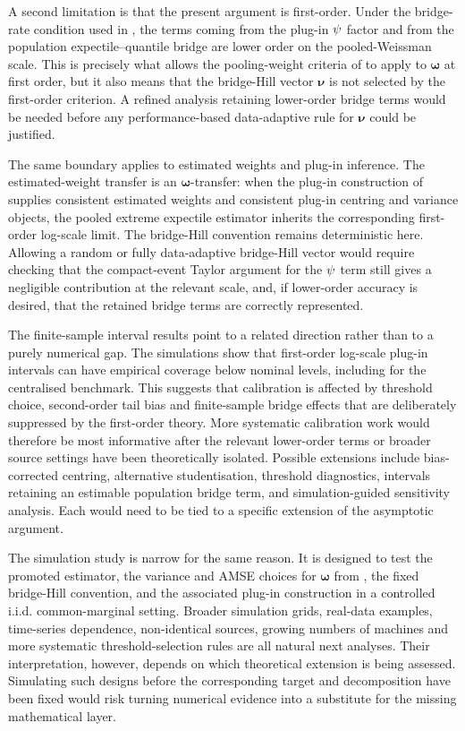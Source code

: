 A second limitation is that the present argument is first-order. Under the
bridge-rate condition used in , the terms coming from
the plug-in \(\psi\) factor and from the population expectile--quantile
bridge are lower order on the pooled-Weissman scale. This is precisely what
allows the pooling-weight criteria of
\textcite[Corollary~5]{DaouiaPadoanStupfler2021} to apply to \(\bm\omega\)
at first order, but it also means that the bridge-Hill vector \(\bm\nu\) is
not selected by the first-order criterion.
A refined analysis retaining lower-order bridge terms would be needed before
any performance-based data-adaptive rule for \(\bm\nu\) could be justified.

The same boundary applies to estimated weights and plug-in inference. The
estimated-weight transfer is an \(\bm\omega\)-transfer: when
the plug-in construction of
\textcite[\S2.2 and Corollary~1; Corollaries~6--7]{DaouiaPadoanStupfler2021}
supplies consistent estimated weights and consistent plug-in centring and
variance objects, the pooled extreme expectile estimator inherits the
corresponding first-order log-scale limit. The
bridge-Hill convention remains deterministic here. Allowing a random
or fully data-adaptive bridge-Hill vector would require checking that the
compact-event Taylor argument for the \(\psi\) term still gives a negligible
contribution at the relevant scale, and, if lower-order accuracy is desired,
that the retained bridge terms are correctly represented.

The finite-sample interval results point to a related direction rather than to
a purely numerical gap. The simulations show that first-order log-scale
plug-in intervals can have empirical coverage below nominal levels, including
for the centralised benchmark.
This suggests that calibration is affected by threshold choice, second-order
tail bias and finite-sample bridge effects that are deliberately suppressed by
the first-order theory. More systematic calibration work would therefore be
most informative after the relevant lower-order terms or broader source
settings have been theoretically isolated. Possible extensions include
bias-corrected centring, alternative studentisation, threshold diagnostics,
intervals retaining an estimable population bridge term, and
simulation-guided sensitivity analysis. Each would need to be tied to a
specific extension of the asymptotic argument.

The simulation study is narrow for the same reason. It is designed to test the
promoted estimator, the variance and AMSE choices for \(\bm\omega\) from
\textcite{DaouiaPadoanStupfler2021}, the fixed bridge-Hill convention, and the
associated plug-in construction in a
controlled i.i.d. common-marginal setting. Broader simulation grids, real-data
examples, time-series dependence, non-identical sources, growing numbers of
machines and more systematic threshold-selection rules are all natural next
analyses. Their interpretation, however, depends on which theoretical
extension is being assessed. Simulating such designs before the corresponding
target and decomposition have been fixed would risk turning numerical
evidence into a substitute for the missing mathematical layer.

